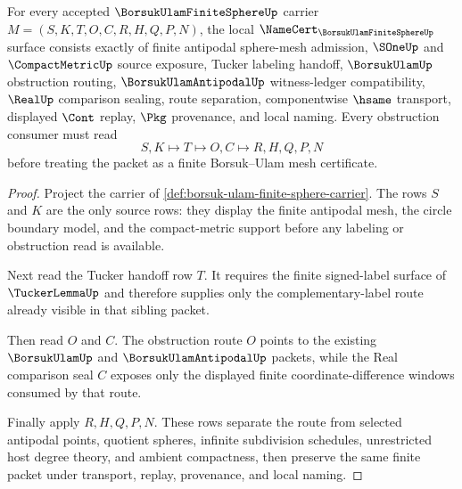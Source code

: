 \begin{theorem}
\label{thm:borsuk-ulam-finite-sphere-namecert-obligations}
For every accepted $\BorsukUlamFiniteSphereUp$ carrier $M=(S,K,T,O,C,R,H,Q,P,N)$, the local $\NameCert_{\BorsukUlamFiniteSphereUp}$ surface consists exactly of finite antipodal sphere-mesh admission, $\SOneUp$ and $\CompactMetricUp$ source exposure, Tucker labeling handoff, $\BorsukUlamUp$ obstruction routing, $\BorsukUlamAntipodalUp$ witness-ledger compatibility, $\RealUp$ comparison sealing, route separation, componentwise $\hsame$ transport, displayed $\Cont$ replay, $\Pkg$ provenance, and local naming. Every obstruction consumer must read
$$
S,K \longmapsto T \longmapsto O,C \longmapsto R,H,Q,P,N
$$
before treating the packet as a finite Borsuk--Ulam mesh certificate.
\end{theorem}
\begin{proof}
Project the carrier of \autoref{def:borsuk-ulam-finite-sphere-carrier}. The rows $S$ and $K$ are the only source rows: they display the finite antipodal mesh, the circle boundary model, and the compact-metric support before any labeling or obstruction read is available.

Next read the Tucker handoff row $T$. It requires the finite signed-label surface of $\TuckerLemmaUp$ and therefore supplies only the complementary-label route already visible in that sibling packet.

Then read $O$ and $C$. The obstruction route $O$ points to the existing $\BorsukUlamUp$ and $\BorsukUlamAntipodalUp$ packets, while the Real comparison seal $C$ exposes only the displayed finite coordinate-difference windows consumed by that route.

Finally apply $R,H,Q,P,N$. These rows separate the route from selected antipodal points, quotient spheres, infinite subdivision schedules, unrestricted host degree theory, and ambient compactness, then preserve the same finite packet under transport, replay, provenance, and local naming.
\end{proof}

